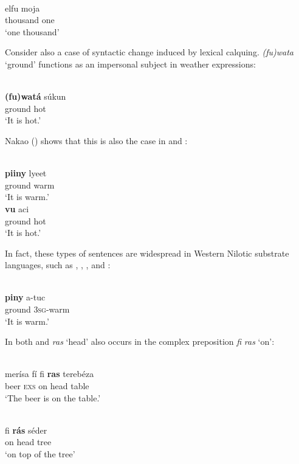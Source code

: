 \documentclass[output=paper]{langsci/langscibook}
\begin{document}
\ea
{ \citep[309]{Luffin2014}}\\
\gll            elfu moja \\
                thousand one \\
\glt     `one thousand'
\z

Consider also a case of syntactic change induced by lexical {calquing}.   \textit{(fu)wata} ‘ground’ functions as an impersonal subject in weather expressions:

\ea
{  \citep[141]{Nakao2012}}\\
\gll   \textbf{(fu)watá} súkun\\
       ground hot\\
\glt     `It is hot.'
\z

Nakao (\citeyear[141]{Nakao2012}) shows that this is also the case in  and :

\ea
{ \citep[141]{Nakao2012}}\\
\gll \textbf{piiny} lyeet\\
     ground warm\\
\glt     `It is warm.'
\ex 
{ \citep[141]{Nakao2012}}\\
\gll \textbf{vu} aci\\
     ground hot\\
\glt     `It is hot.'
\z

In fact, these types of sentences are widespread in Western Nilotic {substrate} languages, such as , , , and :

\ea
{ \citep[202]{Nebel1979}}\\
\gll            \textbf{piny} a-tuc\\
                ground 3\textsc{sg}-warm\\
\glt     `It is warm.'
\z

  In both   and  \textit{ras} ‘head’ also occurs in the complex {preposition} \textit{fi} \textit{ras} ‘on’:

\ea
\ea {}  \citep[141]{Nakao2012}\\
\gll     merísa fí fi \textbf{ras} terebéza\\
         beer \textsc{exs} on head table\\
\glt       `The beer is on the table.'

\ex
{} \citep[159]{Wellens2003}\\
\gll     fi \textbf{rá}\textbf{s} séder\\
         on head tree\\
\glt       `on top of the tree'
\z
\z
\end{document}
